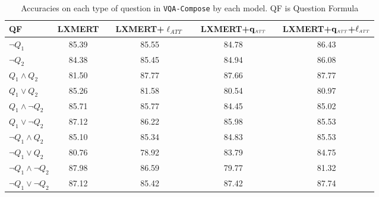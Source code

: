 \begin{table}
    
    \centering
    \begin{tabular}{lcc cc cc c}
    \toprule
    \textbf{QF} & \textbf{LXMERT} &\hphantom& \textbf{LXMERT+$\ell_{ATT}$} &\hphantom & \textbf{LXMERT+$\mathbf{q_{\textit{\tiny ATT}}}$} &\hphantom & \textbf{LXMERT+$\mathbf{q_{\textit{\tiny ATT}}}$+$\mathbf{\ell_{\textit{\tiny ATT}}}$}\\
    \toprule
    $\neg Q_1$                  & 85.39 && 85.55 && 84.78 && 86.43\\
    $\neg Q_2$                  & 84.38 && 85.45 && 84.94 && 86.08\\
    $Q_1\wedge Q_2$             & 81.50 && 87.77 && 87.66 && 87.77\\
    $Q_1 \vee Q_2$              & 85.26 && 81.58 && 80.54 && 80.97\\
    $Q_1 \wedge \neg Q_2$       & 85.71 && 85.77 && 84.45 && 85.02\\
    $Q_1 \vee \neg Q_2$         & 87.12 && 86.22 && 85.98 && 85.53\\
    $\neg Q_1 \wedge Q_2$       & 85.10 && 85.34 && 84.83 && 85.53\\
    $\neg Q_1 \vee Q_2$         & 80.76 && 78.92 && 83.79 && 84.75\\
    $\neg Q_1 \wedge \neg Q_2$  & 87.98 && 86.59 && 79.77 && 81.32\\
    $\neg Q_1 \vee \neg Q_2$    & 87.12 && 85.42 && 87.42 && 87.74\\
    \bottomrule
    \end{tabular}
    \caption{Accuracies on each type of question in \texttt{VQA-Compose} by each model. QF is Question Formula}
    \label{table:heatmap_table_1}
\end{table}